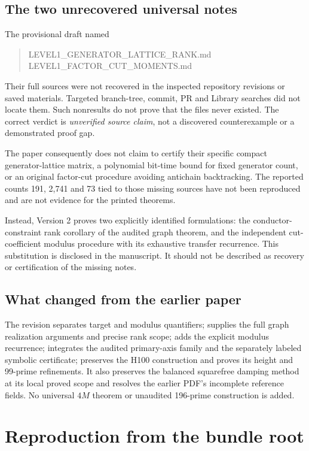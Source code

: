 \documentclass[10pt]{article}
\begin{document}
\subsection{The two unrecovered universal notes}
The provisional draft named
\begin{quote}\ttfamily\small
LEVEL1\_GENERATOR\_LATTICE\_RANK.md\\
LEVEL1\_FACTOR\_CUT\_MOMENTS.md
\end{quote}
Their full sources were not recovered in the inspected repository
revisions or saved materials. Targeted branch-tree, commit, PR and
Library searches did not locate them. Such nonresults do not prove that
the files never existed. The correct verdict is \emph{unverified source
claim}, not a discovered counterexample or a demonstrated proof gap.

The paper consequently does not claim to certify their specific compact
generator-lattice matrix, a polynomial bit-time bound for fixed generator
count, or an original factor-cut procedure avoiding antichain backtracking.
The reported counts 191, 2,741 and 73 tied to those missing sources have
not been reproduced and are not evidence for the printed theorems.

Instead, Version 2 proves two explicitly identified formulations: the
conductor-constraint rank corollary of the audited graph theorem, and the
independent cut-coefficient modulus procedure with its exhaustive transfer
recurrence. This substitution is disclosed in the manuscript. It should
not be described as recovery or certification of the missing notes.

\subsection{What changed from the earlier paper}
The revision separates target and modulus quantifiers; supplies the full
graph realization arguments and precise rank scope; adds the explicit
modulus recurrence; integrates the audited primary-axis family and the
separately labeled symbolic certificate; preserves the H100 construction
and proves its height and 99-prime refinements. It also preserves the
balanced squarefree damping method at its local proved scope and resolves
the earlier PDF's incomplete reference fields. No universal $4M$ theorem
or unaudited 196-prime construction is added.

\newpage
\section{Reproduction from the bundle root}
\end{document}

